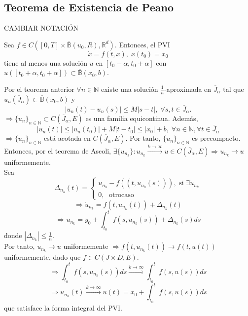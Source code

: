 \subsection{Teorema de Existencia de Peano}

CAMBIAR NOTACIÓN

\begin{theo}[Peano]
  Sea $f \in C([0,T] \times \overline{\mathbb{B}}(u_{0},R), \mathbb{R}^{d})$. Entonces, el PVI 
  \[ 
    \dot{x} = f(t,x), \; x(t_{0}) = x_{0} 
  \] 
  tiene al menos una solución $u$ en $[t_{0} - \alpha, t_{0} + \alpha]$ con $u([t_{0} + \alpha, t_{0} +\alpha]) \subset \overline{\mathbb{B}}(x_{0}, b)$.
\end{theo}

\begin{dem}
  Por el teorema anterior $\forall n \in \mathbb{N}$ existe una solución $\frac{1}{n}$-aproximada en $\overline{J}_{\alpha}$ tal que $u_{n}(\overline{J}_{\alpha}) \subset \overline{\mathbb{B}}(x_{0}, b)$ y
  \[ 
    | u_{n}(t) - u_{n}(s) | \leq M |  s - t | , \; \forall s,t \in \overline{J}_{\alpha}.
  \] 
  $ \Rightarrow \{ u_{n} \}_{n \in \mathbb{N}} \subset C(\overline{J}_{\alpha}, E)$ es una familia equicontinua. Además, 
  \[ 
    | u_{n}(t) | \leq | u_{n}(t_{0}) | + M | t - t_{0} | \leq | x_{0} | + b,\; \forall n \in \mathbb{N}, \forall t \in \overline{J}_{\alpha}
  \] 
  $ \Rightarrow \{ u_{n} \}_{n \in \mathbb{N}}$ está acotada en $C(\overline{J}_{\alpha}, E)$. Por tanto, $\{ u_{n} \}_{n \in \mathbb{N}}$ es precompacto. \\

  Entonces, por el teorema de Ascoli, $\exists \{ u_{n_{k}} \}: u_{n_{k}} \xrightarrow[]{ k \rightarrow \infty} u \in C(\overline{J}_{\alpha}, E) \Rightarrow u_{n_{k}} \rightarrow u$ uniformemente. \\

  Sea
  \[
    \Delta_{n_{k}}(t)  =
    \begin{cases}
      \dot{u}_{n_{k}} - f((t, u_{n_{k}}(s))), \text{ si } \exists \dot{u}_{n_{k}}\\
      0, \; \text{ otrocaso }
    \end{cases}
  \]
  \[ 
    \Rightarrow \dot{u}_{n_{k}} = f(t, u_{n_{k}}(t)) + \Delta_{n_{k}}(t)
  \] 
  \[ 
    \Rightarrow u_{n_{k}} = y_{0} + \int_{t_{0}}^{t} f(s, u_{n_{k}}(s)) + \Delta_{n_{k}}(s) ds
  \] 
  donde $| \Delta_{n_{k}} | \leq \frac{1}{n}$. \\

  Por tanto, $u_{n_{k}} \rightarrow u$ uniformemente $\Rightarrow f(t, u_{n_{k}}(t)) \rightarrow f(t, u(t))$ uniformemente, dado que $f \in C(J \times D, E)$.
  \[ 
    \Rightarrow \int_{t_{0}}^{t} f(s,u_{n_{k}}(s)) ds \xrightarrow[]{k \rightarrow \infty} \int_{t_{0}}^{t}  f(s, u(s)) ds
  \] 
  \[ 
    \Rightarrow  u_{n_{k}}(t) \xrightarrow[]{ k \rightarrow \infty } u(t) = x_{0} + \int_{t_{0}}^{t} f(s, u(s)) ds  
  \] 
  que satisface la forma integral del PVI.
\end{dem}

